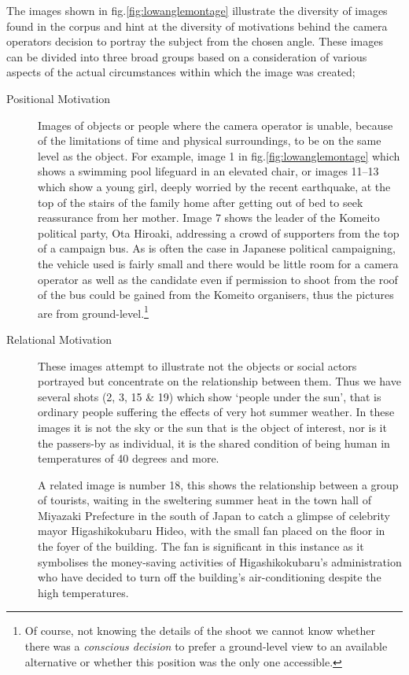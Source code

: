 The images shown in fig.\ref{fig:lowanglemontage} illustrate the diversity of images found in the corpus and hint at the diversity of motivations behind the camera operators decision to portray the subject from the chosen angle. These images can be divided into three broad groups based on a consideration of various aspects of the actual circumstances within which the image was created; 

\begin{description}
\item [Positional Motivation] Images of objects or people where the camera operator is unable, because of the limitations of time and physical surroundings, to be on the same level as the object. For example, image 1 in fig.\ref{fig:lowanglemontage} which shows a swimming pool lifeguard in an elevated chair, or images 11--13 which show a young girl, deeply worried by the recent earthquake, at the top of the stairs of the family home after getting out of bed to seek reassurance from her mother. Image 7 shows the leader of the Komeito political party, Ota Hiroaki, addressing a crowd of supporters from the top of a campaign bus. As is often the case in Japanese political campaigning, the vehicle used is fairly small and there would be little room for a camera operator as well as the candidate even if permission to shoot from the roof of the bus could be gained from the Komeito organisers, thus the pictures are from ground-level.\footnote{Of course, not knowing the details of the shoot we cannot know whether there was a \emph{conscious decision} to prefer a ground-level view to an available alternative or whether this position was the only one accessible.}

\item [Relational Motivation] These images attempt to illustrate not the objects or social actors portrayed but concentrate on the relationship between them. Thus we have several shots (2, 3, 15 \& 19) which show `people under the sun', that is ordinary people suffering the effects of very hot summer weather. In these images it is not the sky or the sun that is the object of interest, nor is it the passers-by as individual, it is the shared condition of being human in temperatures of 40 degrees and more.

A related image is number 18, this shows the relationship between a group of tourists, waiting in the sweltering summer heat in the town hall of Miyazaki Prefecture in the south of Japan to catch a glimpse of celebrity mayor Higashikokubaru Hideo, with the small fan placed on the floor in the foyer of the building. The fan is significant in this instance as it symbolises the money-saving activities of Higashikokubaru's administration who have decided to turn off the building's air-conditioning despite the high temperatures.


\end{description}
